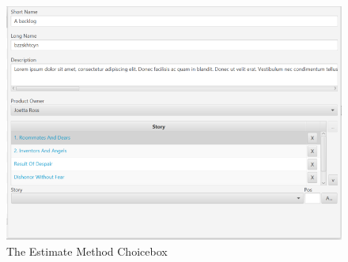 \begin{figure}[H]
\centering
\includegraphics[width=\textwidth]{images/screenshots/backlogs.PNG}
\caption{The Estimate Method Choicebox}
\label{fig:new_project}
\end{figure}